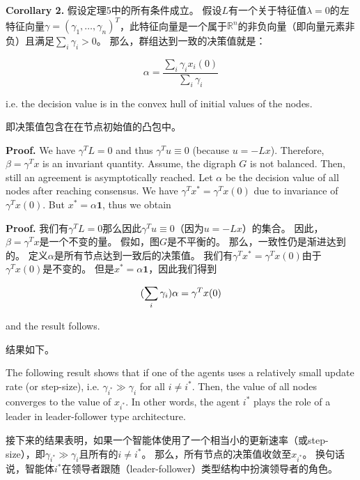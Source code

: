 \documentclass{article}
\begin{document}
\noindent \textbf{Corollary 2.} 假设定理5中的所有条件成立。
假设$L$有一个关于特征值$\lambda=0$的左特征向量$\gamma = (\gamma_1, \dots, \gamma_n)^T$，此特征向量是一个属于$\mathbb{R}^n$的非负向量（即向量元素非负）且满足$\sum_i\gamma_i>0$。
那么，群组达到一致的决策值就是：

\begin{equation}
    \alpha = \frac{\sum_i \gamma_ix_i(0)}{\sum_i\gamma_i}
    \tag{19}
    \label{19}
\end{equation}

{\color[gray]{0.5}
\noindent i.e. the decision value is in the convex hull of initial values of the nodes.
}

\noindent 即决策值包含在在节点初始值的凸包中。

{\color[gray]{0.5}
\noindent \textbf{Proof.} We have $\gamma^TL=0$ and thus $\gamma^Tu\equiv0$ (because $u=-Lx$). 
Therefore, $\beta=\gamma^Tx$ is an invariant quantity. 
Assume, the digraph $G$ is not balanced. 
Then, still an agreement is asymptotically reached. 
Let $\alpha$ be the decision value of all nodes after reaching consensus. 
We have $\gamma^Tx^*=\gamma^Tx(0)$ due to invariance of $\gamma^Tx(0)$. 
But $x^*=\alpha\mathbf{1}$, thus we obtain
}

\noindent \textbf{Proof.} 
我们有$\gamma^TL=0$那么因此$\gamma^Tu\equiv0$（因为$u=-Lx$）的集合。
因此，$\beta=\gamma^Tx$是一个不变的量。
假如，图$G$是不平衡的。
那么，一致性仍是渐进达到的。
定义$\alpha$是所有节点达到一致后的决策值。
我们有$\gamma^Tx^*=\gamma^Tx(0)$由于$\gamma^Tx(0)$是不变的。
但是$x^*=\alpha\mathbf{1}$，因此我们得到

\begin{equation}
    (\sum_i\gamma_i)\alpha = \gamma^Tx(0)
    \notag
\end{equation}

{\color[gray]{0.5}
\noindent and the result follows.
}

\noindent 结果如下。

{\color[gray]{0.5}
The following result shows that if one of the agents uses a relatively small update rate (or step-size), i.e. $\gamma_{i^*}\gg\gamma_i$ for all $i\ne i^*$. 
Then, the value of all nodes converges to the value of $x_{i^*}$. 
In other words, the agent $i^*$ plays the role of a leader in leader-follower type architecture.
}

接下来的结果表明，如果一个智能体使用了一个相当小的更新速率（或step-size），即$\gamma_{i^*}\gg\gamma_i$且所有的$i\ne i^*$。
那么，所有节点的决策值收敛至$x_{i^*}$。
换句话说，智能体$i^*$在领导者跟随（leader-follower）类型结构中扮演领导者的角色。
\end{document}
